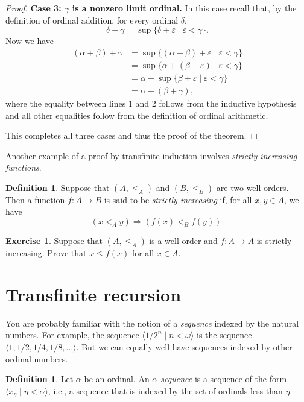 \documentclass[a4paper]{memoir}
\theoremstyle{definition}
\newtheorem{definition}[theorem]{Definition}
\newtheorem{exercise}[theorem]{Exercise}
\newcommand{\ra}{\rightarrow}
\begin{document}
\begin{proof}
  \textbf{Case 3: $\gamma$ is a nonzero limit ordinal.} In this case recall that, by the definition 
  of ordinal addition, for every ordinal $\delta$,
  \[
    \delta + \gamma = \sup\{\delta + \varepsilon \mid \varepsilon < \gamma\}.
  \]
  Now we have
  \begin{align*}
    (\alpha + \beta) + \gamma &= \sup\{(\alpha + \beta) + \varepsilon \mid \varepsilon < \gamma\} \\ 
    &= \sup\{\alpha + (\beta + \varepsilon) \mid \varepsilon < \gamma\} \\ 
    &= \alpha + \sup\{\beta + \varepsilon \mid \varepsilon < \gamma\} \\ 
    &= \alpha + (\beta + \gamma), 
  \end{align*}
  where the equality between lines 1 and 2 follows from the inductive hypothesis and all other 
  equalities follow from the definition of ordinal arithmetic.
  
  This completes all three cases and thus the proof of the theorem.
\end{proof}

Another example of a proof by transfinite induction involves \emph{strictly increasing functions}.

\begin{definition}
  Suppose that $(A, \leq_A)$ and $(B, \leq_B)$ are two well-orders. Then a function 
  $f:A \ra B$ is said to be \emph{strictly increasing} if, for all $x,y \in A$, we have
  \[
    (x <_A y) \Longrightarrow (f(x) <_B f(y)).
  \]
\end{definition}

\begin{exercise}
  Suppose that $(A, \leq_A)$ is a well-order and $f:A \ra A$ is strictly increasing. Prove 
  that $x \leq f(x)$ for all $x \in A$.
\end{exercise}

\section{Transfinite recursion}

You are probably familiar with the notion of a \emph{sequence} indexed by the natural numbers. 
For example, the sequence $\langle 1/2^n \mid n < \omega \rangle$ is the 
sequence $\langle 1, 1/2, 1/4, 1/8, \ldots \rangle$. But we can equally well have sequences 
indexed by other ordinal numbers.

\begin{definition}
  Let $\alpha$ be an ordinal. An \emph{$\alpha$-sequence} is a sequence of the form 
  $\langle x_\eta \mid \eta < \alpha \rangle$, i.e., a sequence that is indexed by 
  the set of ordinals less than $\eta$.
\end{definition}
\end{document}
